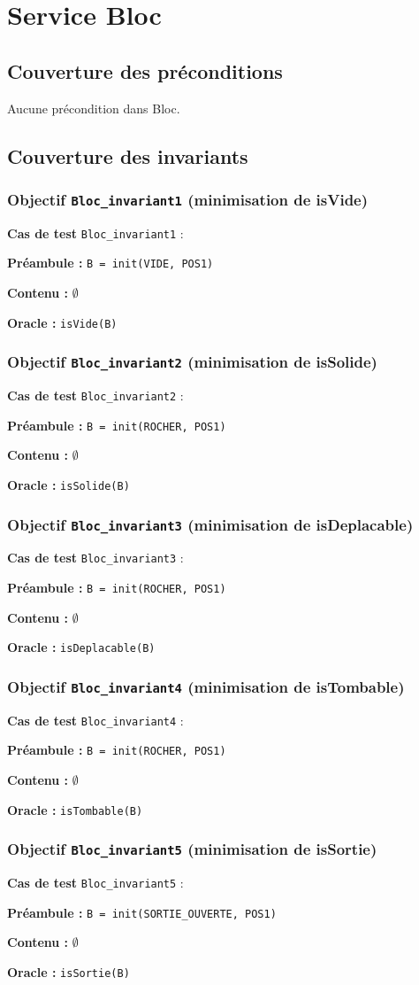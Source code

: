\documentclass{article}
\newcommand{\cmd}[1]{\texttt{#1}}
\newcommand{\obj}[2]{\subsubsection*{\large{\textbf{Objectif {\cmd{#1} (#2)}}}}}
\newenvironment{cas}[1]
{
	\hspace{1em}\textbf{Cas de test} \cmd{#1} :
	\begin{list}{}{}
}{
	\end{list}\vspace{1em}
}
\newcommand{\pre}[1]{\item \textbf{Préambule :} \cmd{#1}}
\newcommand{\nope}{\item \textbf{Contenu :} $\emptyset$}
\newcommand{\ora}[1]{\item \textbf{Oracle :} \cmd{#1}}
\begin{document}
\clearpage{}




















\section{Service Bloc}

\subsection*{Couverture des préconditions}

Aucune précondition dans Bloc.

\subsection*{Couverture des invariants}

\obj{Bloc\_invariant1} {minimisation de isVide}

	\begin{cas}{Bloc\_invariant1}
		\pre{B = init(VIDE, POS1)}
		\nope{}
		\ora{isVide(B)}
	\end{cas}


\obj{Bloc\_invariant2} {minimisation de isSolide}

	\begin{cas}{Bloc\_invariant2}
		\pre{B = init(ROCHER, POS1)}
		\nope{}
		\ora{isSolide(B)}
	\end{cas}


\obj{Bloc\_invariant3} {minimisation de isDeplacable}
	\begin{cas}{Bloc\_invariant3}
		\pre{B = init(ROCHER, POS1)}
		\nope{}
		\ora{isDeplacable(B)}
	\end{cas}

\obj{Bloc\_invariant4} {minimisation de isTombable}
	\begin{cas}{Bloc\_invariant4}
		\pre{B = init(ROCHER, POS1)}
		\nope{}
		\ora{isTombable(B)}
	\end{cas}

\obj{Bloc\_invariant5} {minimisation de isSortie}
	\begin{cas}{Bloc\_invariant5}
		\pre{B = init(SORTIE\_OUVERTE, POS1)}
		\nope{}
		\ora{isSortie(B)}
	\end{cas}
\end{document}
